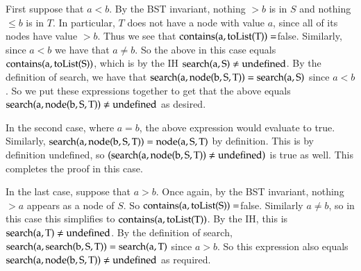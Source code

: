 \documentclass[12pt]{article}
\theoremstyle{definitionstyle}
\begin{document}
\begin{enumerate}[labelindent=0pt, labelwidth=!, wide]
\begin{enumerate}[leftmargin=0pt, label=(\alph*), labelindent=0pt, labelwidth=!, wide]
                First suppose that $a < b$. By the BST invariant, nothing $> b$ is in $S$ and nothing $\leq b$ is in $T$. In particular, $T$ does not have a node with value $a$, since all of its nodes have value $> b$. Thus we see that $\rm contains(a, toList(T)) = $false. Similarly, since $a < b$ we have that $a \neq b$. So the above in this case equals $\rm contains(a, toList(S))$, which is by the IH $\rm search(a, S) \neq undefined$. By the definition of search, we have that $\rm search(a, node(b, S, T)) = \rm search(a, S)$ since $a < b$. So we put these expressions together to get that the above equals $\rm search(a, node(b, S, T)) \neq undefined$ as desired. 

                In the second case, where $a=b$, the above expression would evaluate to true. Similarly, $\rm search(a, node(b, S, T)) = \rm node(a, S, T)$ by definition. This is by definition undefined, so $\newline \rm (search(a, node(b, S, T)) \neq undefined)$ is true as well. This completes the proof in this case.

                In the last case, suppose that $a > b$. Once again, by the BST invariant, nothing $> a$ appears as a node of $S$. So $\rm contains(a, toList(S)) = $false. Similarly $a \neq b$, so in this case this simplifies to $\rm contains(a, toList(T))$. By the IH, this is $\rm search(a, T) \neq undefined$. By the definition of search, $\rm search(a, search(b, S, T)) = \rm search(a, T)$ since $a > b$. So this expression also equals $\rm search(a, node(b, S, T)) \neq undefined$ as required. 
            \end{enumerate}
    \end{enumerate}
\end{document}
